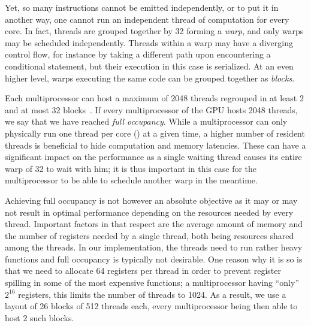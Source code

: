 Yet, so many instructions cannot be emitted independently, or to put it in another way, one cannot run an independent
thread of computation for every core. In fact, threads are grouped together by 32 forming a \emph{warp}, and only
warps may be scheduled independently. Threads within a warp may have a diverging control flow, for instance by
taking a different path upon encountering a conditional statement, but their execution in this case is
serialized. At an even higher level, warps executing the same code can be grouped together as \emph{blocks}.

%

Each multiprocessor can host a maximum of 2048 threads regrouped
in at least 2 and at most 32 blocks~\cite{cuda_prog_guide}. If every multiprocessor of the GPU hosts 2048 threads, we say that we have
reached \emph{full occupancy}. While a multiprocessor can only physically run one thread per core () at a given time,
a higher number of resident threads is beneficial to hide computation and memory latencies.
These can have a significant
impact on the performance as a single waiting thread causes its entire warp of 32 to wait with him; it is thus important in
this case for the multiprocessor to be able to schedule another warp in the meantime.

Achieving full occupancy is not however an absolute objective as it may or may not result in optimal performance depending on the
resources needed by every thread. Important factors in that respect are the average amount of memory and the number of registers
needed by a single thread, both being resources shared among the threads.
In our implementation, the threads need to run rather heavy functions and full occupancy is typically
not desirable. One reason why it is so is that we need to allocate 64 registers per thread in order
to prevent register spilling in some of the most expensive functions; a multiprocessor
having ``only'' $2^{16}$ registers, this limits the number of threads to 1024. As a result, we use a layout of
26 blocks of 512 threads each, every multiprocessor being then able to host 2 such blocks.

